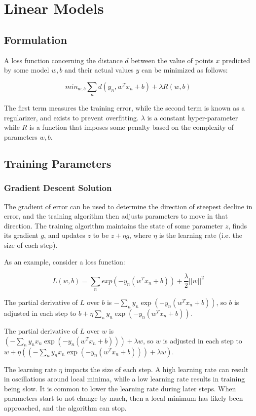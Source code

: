 \documentclass[12pt,titlepage]{article}
\let\stdsection\section
\renewcommand\section{\clearpage\stdsection}
\begin{document}
  \section{Linear Models}

    \subsection{Formulation}
      A loss function concerning the distance $d$ between the value of points $x$ predicted by some model $w, b$ and their actual values $y$ can be minimized as follows:

      $$min_{w,b} \sum_n d(y_n, w^Tx_n + b) + \lambda R(w, b)$$

      The first term measures the training error, while the second term is known as a regularizer, and exists to prevent overfitting. $\lambda$ is a constant hyper-parameter
      while $R$ is a function that imposes some penalty based on the complexity of parameters $w, b$.

    \subsection{Training Parameters}

      \subsubsection{Gradient Descent Solution}
      The gradient of error can be used to determine the direction of steepest decline in error, and the training algorithm then adjusts parameters to move in that direction.
      The training algorithm maintains the state of some parameter $z$, finds its gradient $g$, and updates $z$ to be $z + \eta g$, where $\eta$ is the learning rate (i.e. the
      size of each step).

      As an example, consider a loss function:

      $$L(w,b) = \sum_n exp(-y_n(w^Tx_n + b)) + \frac{\lambda}{2}||w||^2$$

      The partial derivative of $L$ over $b$ is $-\sum_n y_n \exp(-y_n(w^Tx_n + b))$, so $b$ is adjusted in each step to $b + \eta \sum_n y_n \exp(-y_n(w^Tx_n + b))$.

      The partial derivative of $L$ over $w$ is $(-\sum_n y_n x_n \exp(-y_n(w^Tx_n + b))) + \lambda w$, so $w$ is adjusted in each step to
      $w + \eta ((-\sum_n y_n x_n \exp(-y_n(w^Tx_n + b))) + \lambda w)$.

      The learning rate $\eta$ impacts the size of each step. A high learning rate can result in oscillations around local minima, while a low learning rate results in training
      being slow. It is common to lower the learning rate during later steps. When parameters start to not change by much, then a local minimum has likely been approached, and
      the algorithm can stop.
\end{document}
